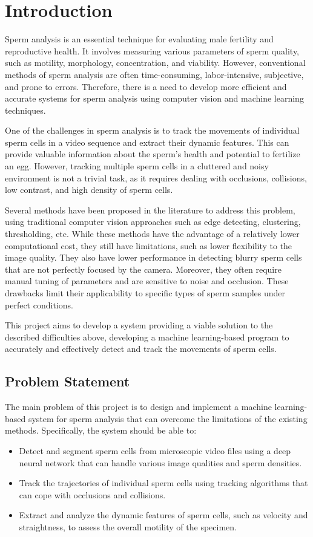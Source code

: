 \chapter{Introduction}
Sperm analysis is an essential technique for evaluating male fertility and reproductive health. It involves measuring various parameters of sperm quality, such as motility, morphology, concentration, and viability. However, conventional methods of sperm analysis are often time-consuming, labor-intensive, subjective, and prone to errors.\cite{anti-conv} Therefore, there is a need to develop more efficient and accurate systems for sperm analysis using computer vision and machine learning techniques.

One of the challenges in sperm analysis is to track the movements of individual sperm cells in a video sequence and extract their dynamic features. This can provide valuable information about the sperm's health and potential to fertilize an egg. However, tracking multiple sperm cells in a cluttered and noisy environment is not a trivial task, as it requires dealing with occlusions, collisions, low contrast, and high density of sperm cells.\cite{difficulties}

Several methods have been proposed in the literature to address this problem, using traditional computer vision approaches such as edge detecting, clustering, thresholding, etc. While these methods have the advantage of a relatively lower computational cost, they still have limitations, such as lower flexibility to the image quality. They also have lower performance in detecting blurry sperm cells that are not perfectly focused by the camera. Moreover, they often require manual tuning of parameters and are sensitive to noise and occlusion. These drawbacks limit their applicability to specific types of sperm samples under perfect conditions.

This project aims to develop a system providing a viable solution to the described difficulties above, developing a machine learning-based program to accurately and effectively detect and track the movements of sperm cells.
\section{Problem Statement}
The main problem of this project is to design and implement a machine learning-based system for sperm analysis that can overcome the limitations of the existing methods. Specifically, the system should be able to:
\begin{itemize}
    \item Detect and segment sperm cells from microscopic video files using a deep neural network that can handle various image qualities and sperm densities.
    \item Track the trajectories of individual sperm cells using tracking algorithms that can cope with occlusions and collisions.
    \item Extract and analyze the dynamic features of sperm cells, such as velocity and straightness, to assess the overall motility of the specimen.
\end{itemize}
